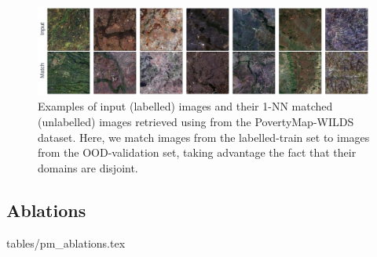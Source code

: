 \begin{figure}[ht!]
  \centering
  \includegraphics[width=1.\textwidth]{figures/matches_examples_pm.pdf}
  \caption{
      Examples of input (labelled) images and their 1-NN matched (unlabelled) images retrieved
      using \CNN{} from the PovertyMap-WILDS dataset.
      Here, we match images from the labelled-train set to images from the OOD-validation set,
      taking advantage the fact that their domains are disjoint.
  }
 \end{figure}
 
\subsection{Ablations}\label{appx:ablations}

{tables/pm_ablations.tex}

